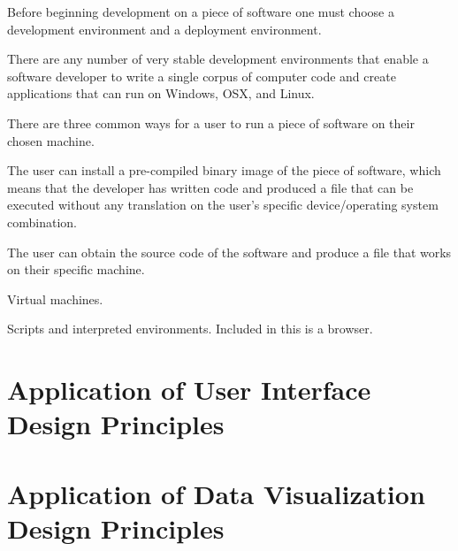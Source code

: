 Before beginning development on a piece of software one must choose a development environment and a deployment environment.

There are any number of very stable development environments that enable a software developer to write a single corpus of computer code and create applications that can run on Windows, OSX, and Linux.

There are three common ways for a user to run a piece of software on their chosen machine.

The user can install a pre-compiled binary image of the piece of software, which means that the developer has written code and produced a file that can be executed without any translation on the user's specific device/operating system combination.

The user can obtain the source code of the software and produce a file that works on their specific machine.

Virtual machines.

Scripts and interpreted environments. Included in this is a browser.

\section{Application of User Interface Design Principles}

\section{Application of Data Visualization Design Principles}
